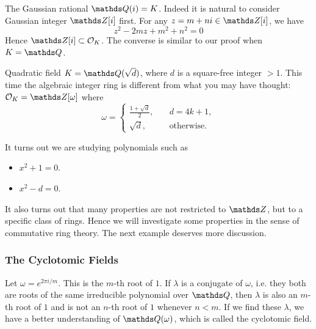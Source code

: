 			\begin{example}
				The Gaussian rational $\Q(i)=K$. Indeed it is natural to consider Gaussian integer $\Z[i]$ first. For any $z=m+ni \in \Z[i]$, we have
				\[
				z^2-2mz+m^2+n^2=0
				\]
				Hence $\Z[i] \subset \OK$. The converse is similar to our proof when $K=\Q$.
			\end{example}
			
			\begin{example}
				Quadratic field $K=\Q(\sqrt{d})$, where $d$ is a square-free integer $>1$. This time the algebraic integer ring is different from what you may have thought: $\OK = \Z[\omega]$ where
				\[
				\omega = \begin{cases}
					\frac{1+\sqrt{d}}{2}, &\quad d = 4k+1, \\
					\sqrt{d}, &\quad \text{otherwise}.
				\end{cases}
				\]
			\end{example}
			It turns out we are studying polynomials such as
			\begin{itemize}
				\item $x^2+1=0$.
				\item $x^2-d=0$.
			\end{itemize}
			It also turns out that many properties are not restricted to $\Z$, but to a specific class of rings. Hence we will investigate some properties in the sense of commutative ring theory. The next example deserves more discussion.
			
			\subsubsection{The Cyclotomic Fields}
				Let $\omega = e^{2\pi i/m}$. This is the $m$-th root of $1$. If $\lambda$ is a conjugate of $\omega$, i.e. they both are roots of the same irreducible polynomial over $\Q$, then $\lambda$ is also an $m$-th root of $1$ and is not an $n$-th root of $1$ whenever $n<m$. If we find these $\lambda$, we have a better understanding of $\Q(\omega)$, which is called the cyclotomic field.
				
